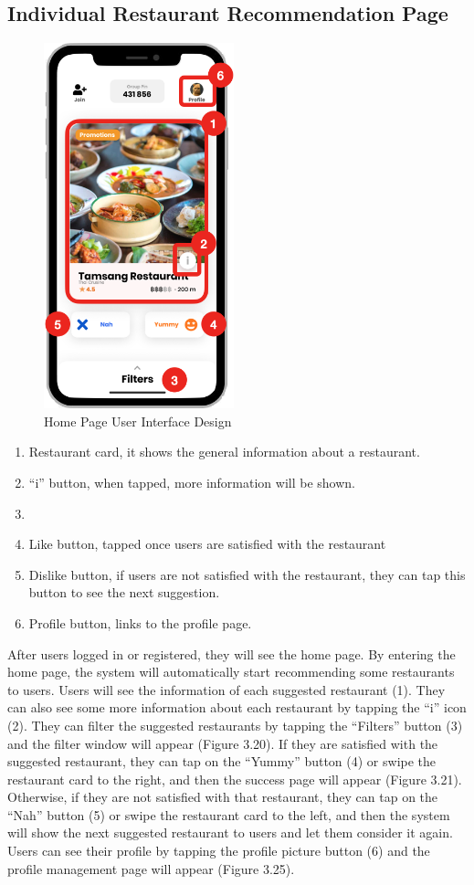 \documentclass[12pt,oneside,openright,a4paper]{cpe-english-project}
\begin{document}
\subsection{Individual Restaurant Recommendation Page}
\begin{figure}[H]\centering
\includegraphics[height=300pt]{./images/3ui_HomePageUserInterfaceDesign.png}
\caption{Home Page User Interface Design}\label{fig:3ui_HomePageUserInterfaceDesign}
\end{figure}
\begin{enumerate}
\item Restaurant card, it shows the general information about a restaurant.
\item “i” button, when tapped, more information will be shown.
\item 
\item Like button, tapped once users are satisfied with the restaurant
\item Dislike button, if users are not satisfied with the restaurant, they can tap this button to see the next suggestion.
\item Profile button, links to the profile page.
\end{enumerate}
After users logged in or registered, they will see the home page. By entering the home page, the system will automatically start recommending some restaurants to users. Users will see the information of each suggested restaurant (1). They can also see some more information about each restaurant by tapping the “i” icon (2). They can filter the suggested restaurants by tapping the “Filters” button (3) and the filter window will appear (Figure 3.20). If they are satisfied with the suggested restaurant, they can tap on the “Yummy” button (4) or swipe the restaurant card to the right, and then the success page will appear (Figure 3.21). Otherwise, if they are not satisfied with that restaurant, they can tap on the “Nah” button (5) or swipe the restaurant card to the left, and then the system will show the next suggested restaurant to users and let them consider it again. Users can see their profile by tapping the profile picture button (6) and the profile management page will appear (Figure 3.25).
\end{document}
